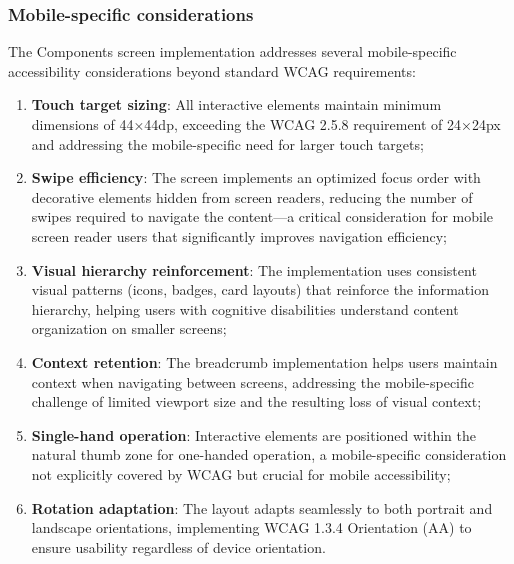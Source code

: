 \FloatBarrier

\subsubsection{Mobile-specific considerations}

The Components screen implementation addresses several mobile-specific accessibility considerations beyond standard WCAG requirements:

\begin{enumerate}
    \item \textbf{Touch target sizing}: All interactive elements maintain minimum dimensions of 44×44dp, exceeding the WCAG 2.5.8 requirement of 24×24px and addressing the mobile-specific need for larger touch targets;
    
    \item \textbf{Swipe efficiency}: The screen implements an optimized focus order with decorative elements hidden from screen readers, reducing the number of swipes required to navigate the content—a critical consideration for mobile screen reader users that significantly improves navigation efficiency;
    
    \item \textbf{Visual hierarchy reinforcement}: The implementation uses consistent visual patterns (icons, badges, card layouts) that reinforce the information hierarchy, helping users with cognitive disabilities understand content organization on smaller screens;
    
    \item \textbf{Context retention}: The breadcrumb implementation helps users maintain context when navigating between screens, addressing the mobile-specific challenge of limited viewport size and the resulting loss of visual context;
    
    \item \textbf{Single-hand operation}: Interactive elements are positioned within the natural thumb zone for one-handed operation, a mobile-specific consideration not explicitly covered by WCAG but crucial for mobile accessibility;
    
    \item \textbf{Rotation adaptation}: The layout adapts seamlessly to both portrait and landscape orientations, implementing WCAG 1.3.4 Orientation (AA) to ensure usability regardless of device orientation.
\end{enumerate}

\FloatBarrier

